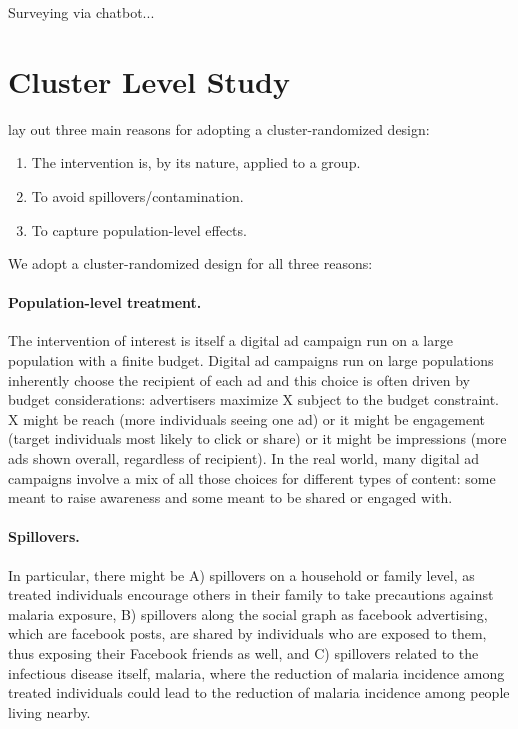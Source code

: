 \documentclass[a4paper,12pt]{article}
\theoremstyle{proposition}
\begin{document}
Surveying via chatbot...


\section{Cluster Level Study}

\cite{Hayes2017} lay out three main reasons for adopting a cluster-randomized design:

\begin{enumerate}
\item The intervention is, by its nature, applied to a group.
\item To avoid spillovers/contamination.
\item To capture population-level effects.
\end{enumerate}

\noindent We adopt a cluster-randomized design for all three reasons:

\paragraph{Population-level treatment.} The intervention of interest is itself a digital ad campaign run on a large population with a finite budget. Digital ad campaigns run on large populations inherently choose the recipient of each ad and this choice is often driven by budget considerations: advertisers maximize X subject to the budget constraint. X might be reach (more individuals seeing one ad) or it might be engagement (target individuals most likely to click or share) or it might be impressions (more ads shown overall, regardless of recipient). In the real world, many digital ad campaigns involve a mix of all those choices for different types of content: some meant to raise awareness and some meant to be shared or engaged with.


\paragraph{Spillovers.} In particular, there might be A) spillovers on a household or family level, as treated individuals encourage others in their family to take precautions against malaria exposure, B) spillovers along the social graph as facebook advertising, which are facebook posts, are shared by individuals who are exposed to them, thus exposing their Facebook friends as well, and C) spillovers related to the infectious disease itself, malaria, where the reduction of malaria incidence among treated individuals could lead to the reduction of malaria incidence among people living nearby.
\end{document}
